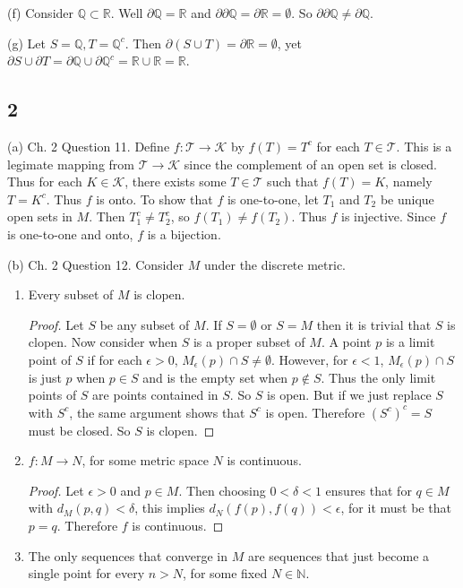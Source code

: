 \documentclass[11pt]{article}
\begin{document}
(f) Consider $\mathbb{Q} \subset \mathbb{R}$. Well $\partial \mathbb{Q} = \mathbb{R}$ and $\partial\partial \mathbb{Q} = \partial \mathbb{R} = \emptyset$. So $\partial\partial \mathbb{Q} \neq \partial \mathbb{Q}$.

(g) Let $S = \mathbb{Q}, T = \mathbb{Q}^{c}$. Then $\partial(S\cup T) = \partial\mathbb{R} = \emptyset$, yet 
$\partial S \cup \partial T = \partial \mathbb{Q} \cup \partial \mathbb{Q}^{c} = \mathbb{R}\cup \mathbb{R} = \mathbb{R}$.


\subsection*{2}

(a) Ch. 2 Question 11. Define $f:\mathcal{T}\rightarrow \mathcal{K}$ by $f(T) = T^{c}$ for each $T\in\mathcal{T}$. This is a 
legimate mapping from $\mathcal{T}\rightarrow \mathcal{K}$ since the complement of an open set is closed.
Thus for each $K\in \mathcal{K}$, there exists some $T\in\mathcal{T}$ such that $f(T) = K$, namely $T = K^{c}$. Thus $f$ is onto.
To show that $f$ is one-to-one, let $T_{1}$ and $T_{2}$ be unique open sets in $M$. Then $T_{1}^{c} \neq T_{2}^{c}$, so $f(T_{1})\neq f(T_{2})$. Thus
$f$ is injective. Since $f$ is one-to-one and onto, $f$ is a bijection.

(b) Ch. 2 Question 12. Consider $M$ under the discrete metric.

\begin{enumerate}
    \item Every subset of $M$ is clopen.
      \begin{proof}
        Let $S$ be any subset of $M$. If $S = \emptyset$ or $S = M$ then it is trivial that $S$ is clopen. Now consider 
        when $S$ is a proper subset of $M$. A point $p$ is a limit point of $S$ if for each $\epsilon > 0$, $M_{\epsilon}(p)\cap S \neq \emptyset$.
        However, for $\epsilon < 1$, $M_{\epsilon}(p) \cap S$ is just $p$ when $p\in S$ and is the empty set when $p\notin S$. Thus 
        the only limit points of $S$ are points contained in $S$. So $S$ is open. But if we just replace $S$ with $S^{c}$, the same argument shows 
        that $S^{c}$ is open. Therefore $(S^{c})^{c} = S$ must be closed. So $S$ is clopen.
      \end{proof}
    \item $f: M \rightarrow N$, for some metric space $N$ is continuous.
      \begin{proof}
        Let $\epsilon > 0$ and $p\in M$. Then choosing $0 < \delta < 1$ ensures that for $q\in M$ with $d_{M}(p,q) < \delta$, this implies $d_{N}(f(p),f(q)) < \epsilon$, for 
        it must be that $p = q$. Therefore $f$ is continuous.
      \end{proof}
    \item The only sequences that converge in $M$ are sequences that just become a single point for every $n > N$, for some fixed $N \in \mathbb{N}$.
\end{enumerate}
\end{document}
